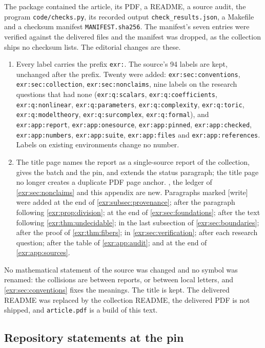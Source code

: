 \documentclass[11pt,letterpaper]{article}
\numberwithin{equation}{section}
\theoremstyle{definition}
\theoremstyle{remark}
\newcommand{\rpath}[1]{\nolinkurl{#1}}%
\newcommand{\lbl}[1]{\nolinkurl{#1}}%
\newcommand{\wtag}{\textup{[write]}}%
\begin{document}
The package contained the article, its PDF, a README, a source audit, the
program \texttt{code/checks.py}, its recorded output
\texttt{check\_results.json}, a Makefile and a checksum manifest
\texttt{MANIFEST.sha256}. The manifest's seven entries were verified against
the delivered files and the manifest was dropped, as the collection ships no
checksum lists. The editorial changes are these.
\begin{enumerate}[label=(\arabic*)]
\item Every label carries the prefix \texttt{exr:}. The source's 94 labels are
kept, unchanged after the prefix. Twenty were added:
\lbl{exr:sec:conventions}, \lbl{exr:sec:collection},
\lbl{exr:sec:nonclaims}, nine labels on the research questions that had none
(\lbl{exr:q:scalars}, \lbl{exr:q:coefficients}, \lbl{exr:q:nonlinear},
\lbl{exr:q:parameters}, \lbl{exr:q:complexity}, \lbl{exr:q:toric},
\lbl{exr:q:modeltheory}, \lbl{exr:q:surcomplex}, \lbl{exr:q:formal}), and
\lbl{exr:app:report}, \lbl{exr:app:onesource}, \lbl{exr:app:pinned},
\lbl{exr:app:checked}, \lbl{exr:app:numbers}, \lbl{exr:app:suite},
\lbl{exr:app:files} and \lbl{exr:app:references}. Labels on existing
environments change no number.
\item The title page names the report as a single-source report of the
collection, gives the batch and the pin, and extends the status paragraph;
the title page no longer creates a duplicate PDF page anchor.
, the ledger of
\cref{exr:sec:nonclaims} and this appendix are new. Paragraphs marked \wtag{}
were added at the end of \cref{exr:subsec:provenance}; after the paragraph
following \cref{exr:prop:division}; at the end of \cref{exr:sec:foundations};
after the text following \cref{exr:thm:undecidable}; in the last subsection
of \cref{exr:sec:boundaries}; after the proof of \cref{exr:thm:fibers}; in
\cref{exr:sec:verification}; after each research question; after the table
of \cref{exr:app:audit}; and at the end of \cref{exr:app:sources}.
\end{enumerate}
No mathematical statement of the source was changed and no symbol was
renamed: the collisions are between reports, or between local letters, and
\cref{exr:sec:conventions} fixes the meanings. The title is kept. The
delivered README was replaced by the collection README, the delivered PDF is
not shipped, and \rpath{article.pdf} is a build of this text.

\subsection{Repository statements at the pin}\label{exr:app:pinned}
\end{document}
